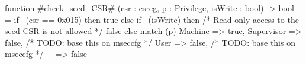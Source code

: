 function #\hyperref[sailRISCVzcheckzyseedzyCSR]{check\_seed\_CSR}# (csr : csreg, p : Privilege, isWrite : bool) -> bool = {
  if ~(csr == 0x015) then {
    true
  } else if ~(isWrite) then {
    /* Read-only access to the seed CSR is not allowed */
    false
  } else {
    match (p) {
      Machine => true,
      Supervisor => false, /* TODO: base this on mseccfg */
      User => false, /* TODO: base this on mseccfg */
      _ => false
    }
  }
}
